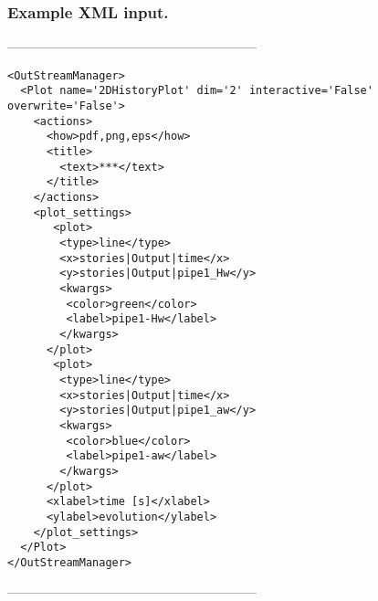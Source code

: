 \subsubsection{Example XML input.}
-----------------------------------------------------------
\begin{lstlisting}[style=XML]
<OutStreamManager>
  <Plot name='2DHistoryPlot' dim='2' interactive='False' overwrite='False'>
    <actions>
      <how>pdf,png,eps</how>
      <title>
        <text>***</text>
      </title>
    </actions>
    <plot_settings>
       <plot>
        <type>line</type>
        <x>stories|Output|time</x>
        <y>stories|Output|pipe1_Hw</y>
        <kwargs>
         <color>green</color>
         <label>pipe1-Hw</label>
        </kwargs>
      </plot>
       <plot>
        <type>line</type>
        <x>stories|Output|time</x>
        <y>stories|Output|pipe1_aw</y>
        <kwargs>
         <color>blue</color>
         <label>pipe1-aw</label>
        </kwargs>
      </plot>
      <xlabel>time [s]</xlabel>
      <ylabel>evolution</ylabel>
    </plot_settings>
  </Plot>
</OutStreamManager>
\end{lstlisting}
-----------------------------------------------------------

